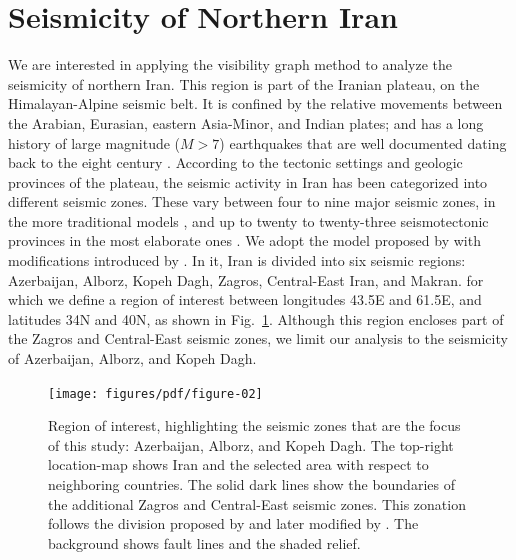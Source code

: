 
\section{Seismicity of Northern Iran}
\label{sec:seismicity}

We are interested in applying the visibility graph method to analyze the seismicity of northern Iran. This region is part of the Iranian plateau, on the Himalayan-Alpine seismic belt. It is confined by the relative movements between the Arabian, Eurasian, eastern Asia-Minor, and Indian plates; and has a long history of large magnitude ($M>7$) earthquakes that are well documented dating back to the eight century \citep[e.g.,][]{Berberian_1981_Chap}. According to the tectonic settings and geologic provinces of the plateau, the seismic activity in Iran has been categorized into different seismic zones. These vary between four to nine major seismic zones, in the more traditional models \citep[e.g.,][]{Stocklin1968, Takin1972, Berberian1976}, and up to twenty to twenty-three seismotectonic provinces in the most elaborate ones \citep[e.g.,][]{Nowroozi1976, Tavakoli1999}. We adopt the model proposed by \citet{Mirzaei1998} with modifications introduced by \citet{Karimiparidari2013}. In it, Iran is divided into six seismic regions: Azerbaijan, Alborz, Kopeh Dagh, Zagros, Central-East Iran, and Makran.  for which we define a region of interest between longitudes 43.5\textdegree{}E and 61.5\textdegree{}E, and latitudes 34\textdegree{}N and 40\textdegree{}N, as shown in Fig.~\ref{fig:study_region}. Although this region encloses part of the Zagros and Central-East seismic zones, we limit our analysis to the seismicity of Azerbaijan, Alborz, and Kopeh Dagh.

\begin{figure}[t]
	\centering
	\texttt{[image: figures/pdf/figure-02]} 
	\caption{Region of interest, highlighting the seismic zones that are the focus of this study: Azerbaijan, Alborz, and Kopeh Dagh. The top-right location-map shows Iran and the selected area with respect to neighboring countries. The solid dark lines show the boundaries of the additional Zagros and Central-East seismic zones. This zonation follows the division proposed by \citet{Mirzaei1998} and later modified by \citet{Karimiparidari2013}. The background shows fault lines and the shaded relief.}
	\label{fig:study_region}
\end{figure}

